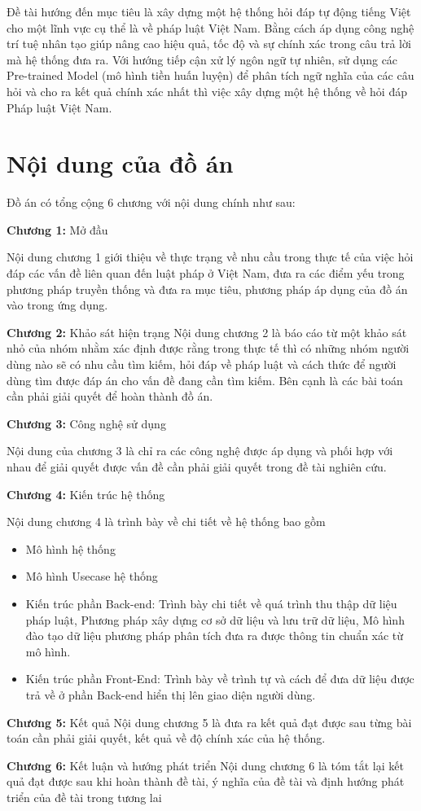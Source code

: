 Đề tài hướng đến mục tiêu là xây dựng một hệ thống hỏi đáp tự động tiếng Việt cho một lĩnh vực cụ thể là về pháp luật Việt Nam. Bằng cách áp dụng công nghệ trí tuệ nhân tạo giúp nâng cao hiệu quả, tốc độ và sự chính xác trong câu trả lời mà hệ thống đưa ra. Với hướng tiếp cận xử lý ngôn ngữ tự nhiên, sử dụng các Pre-trained Model (mô hình tiền huấn luyện) để phân tích ngữ nghĩa của các câu hỏi và cho ra kết quả chính xác nhất thì việc xây dựng một hệ thống về hỏi đáp Pháp luật Việt Nam.

\pagebreak
\section{Nội dung của đồ án}

Đồ án có tổng cộng 6 chương với nội dung chính như sau:

\textbf{Chương 1:} Mở đầu

    Nội dung chương 1 giới thiệu về thực trạng về nhu cầu trong thực tế của việc hỏi đáp các vấn đề liên quan đến luật pháp ở Việt Nam, đưa ra các điểm yếu trong phương pháp truyền thống và đưa ra mục tiêu, phương pháp áp dụng của đồ án vào trong ứng dụng.

\textbf{Chương 2:} Khảo sát hiện trạng
	Nội dung chương 2 là báo cáo từ một khảo sát nhỏ của nhóm nhằm xác định được rằng trong thực tế thì có những nhóm người dùng nào sẽ có nhu cầu tìm kiếm, hỏi đáp về pháp luật và cách thức để người dùng tìm được đáp án cho vấn đề đang cần tìm kiếm. Bên cạnh là các bài toán cần phải giải quyết để hoàn thành đồ án.

\textbf{Chương 3:} Công nghệ sử dụng

    Nội dung của chương 3 là chỉ ra các công nghệ được áp dụng và phối hợp với nhau để giải quyết được vấn đề cần phải giải quyết trong đề tài nghiên cứu.

\textbf{Chương 4:} Kiến trúc hệ thống

    Nội dung chương 4 là trình bày về chi tiết về hệ thống bao gồm
    \begin{itemize}
    	\item Mô hình hệ thống
    	\item Mô hình Usecase hệ thống
    	\item Kiến trúc phần Back-end: Trình bày chi tiết về quá trình thu thập dữ liệu pháp luật, Phương pháp xây dựng cơ sở dữ liệu và lưu trữ dữ liệu, Mô hình đào tạo dữ liệu phương pháp phân tích đưa ra được thông tin chuẩn xác từ mô hình. 
    	\item Kiến trúc phần Front-End: Trình bày về trình tự và cách để đưa dữ liệu được trả về ở phần Back-end hiển thị lên giao diện người dùng.
    \end{itemize}

\textbf{Chương 5:} Kết quả 
	Nội dung chương 5 là đưa ra kết quả đạt được sau từng bài toán cần phải giải quyết, kết quả về độ chính xác của hệ thống.

\textbf{Chương 6:} Kết luận và hướng phát triển
    Nội dung chương 6 là tóm tắt lại kết quả đạt được sau khi hoàn thành đề tài, ý nghĩa của đề tài và định hướng phát triển của đề tài trong tương lai
